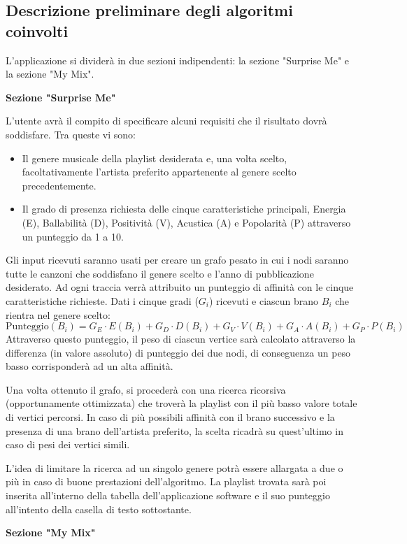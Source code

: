 \documentclass[12pt, a4paper]{article}
\begin{document}
\subsection{Descrizione preliminare degli algoritmi coinvolti}
L'applicazione si dividerà in due sezioni indipendenti: la sezione "Surprise Me" e la sezione "My Mix".

\textbf{Sezione "Surprise Me"}

L’utente avrà il compito di specificare alcuni requisiti che il risultato dovrà soddisfare. Tra queste vi sono:
\begin{itemize}
\item Il genere musicale della playlist desiderata e, una volta scelto, facoltativamente l’artista preferito appartenente al genere scelto precedentemente.
\item Il grado di presenza richiesta delle cinque caratteristiche principali, Energia (E), Ballabilità (D), Positività (V), Acustica (A) e Popolarità (P) attraverso un punteggio da 1 a 10.
\end{itemize}

Gli input ricevuti saranno usati per creare un grafo pesato in cui i nodi saranno tutte le canzoni che soddisfano il genere scelto e l’anno di pubblicazione desiderato.
Ad ogni traccia verrà attribuito un punteggio di affinità con le cinque caratteristiche richieste.
Dati i cinque gradi ($G_i$) ricevuti e ciascun brano $B_i$ che rientra nel genere scelto:
$$ \text{Punteggio}(B_i) = G_E \cdot E(B_i) + G_D \cdot D(B_i) + G_V \cdot V(B_i) + G_A \cdot A(B_i) + G_P \cdot P(B_i) $$
Attraverso questo punteggio, il peso di ciascun vertice sarà calcolato attraverso la differenza (in valore assoluto) di punteggio dei due nodi, di conseguenza un peso basso corrisponderà ad un alta affinità. \par
Una volta ottenuto il grafo, si procederà con una ricerca ricorsiva (opportunamente ottimizzata) che troverà la playlist con il più basso valore totale di vertici percorsi. In caso di più possibili affinità con il brano successivo e la presenza di una brano dell’artista preferito, la scelta ricadrà su quest’ultimo in caso di pesi dei vertici simili. \par
L’idea di limitare la ricerca ad un singolo genere potrà essere allargata a due o più in caso di buone prestazioni dell’algoritmo.
La playlist trovata sarà poi inserita all’interno della tabella dell’applicazione software e il suo punteggio all’intento della casella di testo sottostante.

\newpage
\textbf{Sezione "My Mix"}
\end{document}
